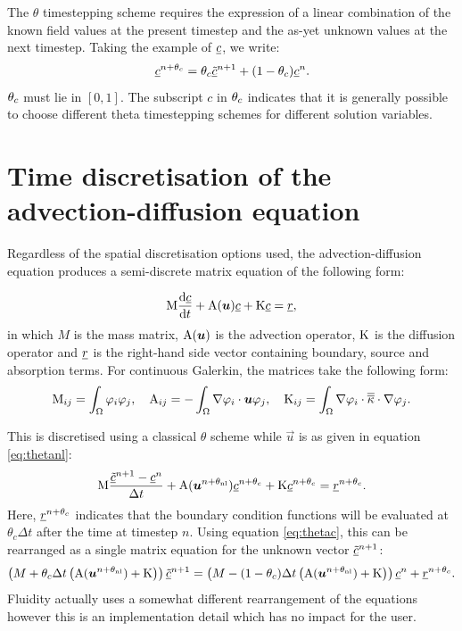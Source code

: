 The $\theta$ timestepping scheme requires the expression of a linear
combination of the known field values at the present timestep and the as-yet
unknown values at the next timestep. Taking the example of $\underline{c}$, we write:
\begin{equation}
  \label{eq:thetac}
  \underline{c}^{n+\theta_c}=\theta_c\underline{\tilde c}^{n+1}+(1-\theta_c)\underline{c}^{n}.
\end{equation}
$\theta_c$ must lie in $[0,1]$. The subscript $c$ in $\theta_c$ indicates that it is
generally possible to choose different theta timestepping schemes for different solution
variables.

\section{Time discretisation of the advection-diffusion equation}
\label{sec:ND_time_disct_adv_diff}

Regardless of the spatial discretisation options used, the
advection-diffusion equation produces a semi-discrete matrix equation of the
following form:

\begin{equation}
  \mathrm{M} \frac{\mathrm{d}\underline{c}}{\mathrm{d} t}+\mathrm{A}({\mbox{\boldmath$u$}})\underline{c}+\mathrm{K}\underline{c}=\underline{r},
\end{equation}
in which $M$ is the mass matrix, $\mathrm{A}({\mbox{\boldmath$u$}})$ is the advection
operator, $\mathrm{K}$ is the diffusion operator and $\underline{r}$ is the
right-hand side vector containing boundary, source and absorption terms. For continuous
Galerkin, the matrices take the following form:
\begin{equation}
  \mathrm{M}_{ij}=\int_\Omega \varphi_i\varphi_j, \quad
  \mathrm{A}_{ij}=-\int_\Omega \nabla\varphi_i\cdot{\mbox{\boldmath$u$}} \varphi_j, \quad
  \mathrm{K}_{ij}=\int_\Omega \nabla\varphi_i\cdot \overline{\overline{\kappa}}\cdot\nabla \varphi_j.
\end{equation}

This is discretised using a classical $\theta$ scheme while $\vec u$ is as
given in equation \eqref{eq:thetanl}:
\begin{equation}
  \mathrm{M} \frac{\underline{\tilde c}^{n+1}-\underline{c}^{n}}{\Delta t}
  +\mathrm{A}({\mbox{\boldmath$u$}}^{n+\theta_{\mathrm{nl}}})\underline{c}^{n+\theta_c}+\mathrm{K}\underline{c}^{n+\theta_c}=\underline{r}^{n+\theta_c}.
\end{equation}
Here, $\underline{r}^{n+\theta_c}$ indicates that the boundary condition
functions will be evaluated at $\theta_c\Delta t$ after the time at timestep
$n$. Using equation \eqref{eq:thetac}, this can be rearranged as a single
matrix equation for the unknown vector $\underline{\tilde c}^{n+1}$:
\begin{equation}
  \left(M+\theta_c\Delta t\left(\mathrm{A}({\mbox{\boldmath$u$}}^{n+\theta_{\mathrm{nl}}})+\mathrm{K}\right)\right)\underline{\tilde c}^{n+1}
  =\left(M-(1-\theta_c)\Delta
    t\left(\mathrm{A}({\mbox{\boldmath$u$}}^{n+\theta_{\mathrm{nl}}})+\mathrm{K}\right)\right)\underline{c}^{n} +\underline{r}^{n+\theta_c}.
\end{equation}
Fluidity actually uses a somewhat different rearrangement of the equations
however this is an implementation detail which has no impact for the user.

